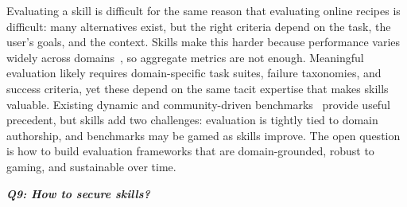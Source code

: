 \documentclass[sigconf,nonacm]{acmart}
\begin{document}
Evaluating a skill is difficult for the same reason that evaluating online recipes is difficult: many alternatives exist, but the right criteria depend on the task, the user’s goals, and the context. Skills make this harder because performance varies widely across domains~\cite{skillsbench2026}, so aggregate metrics are not enough. Meaningful evaluation likely requires domain-specific task suites, failure taxonomies, and success criteria, yet these depend on the same tacit expertise that makes skills valuable. Existing dynamic and community-driven benchmarks~\cite{kiela2021dynabench,srivastava2023beyond,jimenez2024swebench} provide useful precedent, but skills add two challenges: evaluation is tightly tied to domain authorship, and benchmarks may be gamed as skills improve. The open question is how to build evaluation frameworks that are domain-grounded, robust to gaming, and sustainable over time.


\vspace{+0.02in}
\emph{\textbf{Q9: How to secure skills? }} %
\end{document}
